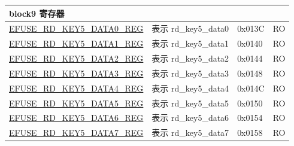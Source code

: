 \begin{longtable}{ | p{7cm} | p{6cm} | p{1.2cm} | p{1.5cm} | }
\multicolumn{4}{|l|}{\textbf{block9 寄存器}} \\ \hline
\hyperref[regdesc:EFUSERDKEY5DATANREG]{EFUSE\_RD\_KEY5\_DATA0\_REG} & 表示 rd\_key5\_data0 & 0x013C & RO \\ \hline
\hyperref[regdesc:EFUSERDKEY5DATANREG]{EFUSE\_RD\_KEY5\_DATA1\_REG} & 表示 rd\_key5\_data1 & 0x0140 & RO \\ \hline
\hyperref[regdesc:EFUSERDKEY5DATANREG]{EFUSE\_RD\_KEY5\_DATA2\_REG} & 表示 rd\_key5\_data2 & 0x0144 & RO \\ \hline
\hyperref[regdesc:EFUSERDKEY5DATANREG]{EFUSE\_RD\_KEY5\_DATA3\_REG} & 表示 rd\_key5\_data3 & 0x0148 & RO \\ \hline
\hyperref[regdesc:EFUSERDKEY5DATANREG]{EFUSE\_RD\_KEY5\_DATA4\_REG} & 表示 rd\_key5\_data4 & 0x014C & RO \\ \hline
\hyperref[regdesc:EFUSERDKEY5DATANREG]{EFUSE\_RD\_KEY5\_DATA5\_REG} & 表示 rd\_key5\_data5 & 0x0150 & RO \\ \hline
\hyperref[regdesc:EFUSERDKEY5DATANREG]{EFUSE\_RD\_KEY5\_DATA6\_REG} & 表示 rd\_key5\_data6 & 0x0154 & RO \\ \hline
\hyperref[regdesc:EFUSERDKEY5DATANREG]{EFUSE\_RD\_KEY5\_DATA7\_REG} & 表示 rd\_key5\_data7 & 0x0158 & RO \\ \hline


\end{longtable}
